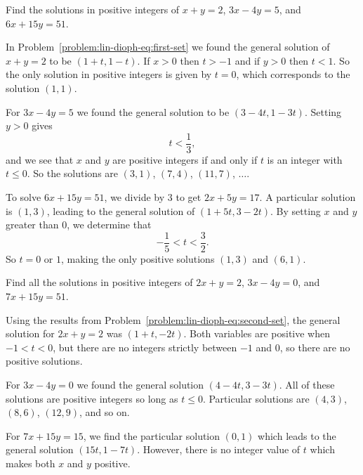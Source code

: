 Find the solutions in positive integers of $x + y = 2$,
$3x - 4y = 5$, and $6x + 15y = 51$.
\begin{solution}
  In Problem~\ref{problem:lin-dioph-eq:first-set} we found the general
  solution of $x + y = 2$ to be $(1+t,1-t)$. If $x > 0$ then $t > -1$
  and if $y > 0$ then $t < 1$. So the only solution in positive
  integers is given by $t = 0$, which corresponds to the solution
  $(1,1)$.

  For $3x - 4y = 5$ we found the general solution to be
  $(3 - 4t, 1 - 3t)$. Setting $y > 0$ gives
  \begin{equation*}
    t < \frac13,
  \end{equation*}
  and we see that $x$ and $y$ are positive integers if and only if $t$
  is an integer with $t\leq0$. So the solutions are $(3,1)$, $(7,4)$,
  $(11,7)$, $\dots$.

  To solve $6x + 15y = 51$, we divide by $3$ to get $2x + 5y = 17$. A
  particular solution is $(1,3)$, leading to the general solution of
  $(1+5t,3-2t)$. By setting $x$ and $y$ greater than $0$, we determine
  that
  \begin{equation*}
    -\frac15 < t < \frac32.
  \end{equation*}
  So $t = 0$ or $1$, making the only positive solutions $(1,3)$ and
  $(6,1)$.
\end{solution}

 Find all the solutions in positive integers of $2x + y = 2$,
$3x - 4y = 0$, and $7x + 15y = 51$.
\begin{solution}
  Using the results from
  Problem~\ref{problem:lin-dioph-eq:second-set}, the general solution
  for $2x + y = 2$ was $(1+t,-2t)$. Both variables are positive when
  $-1<t<0$, but there are no integers strictly between $-1$ and $0$,
  so there are no positive solutions.

  For $3x - 4y = 0$ we found the general solution $(4-4t,3-3t)$. All
  of these solutions are positive integers so long as
  $t\leq0$. Particular solutions are $(4,3)$, $(8,6)$, $(12,9)$, and
  so on.

  For $7x + 15y = 15$, we find the particular solution $(0,1)$ which
  leads to the general solution $(15t,1-7t)$. However, there is no
  integer value of $t$ which makes both $x$ and $y$ positive.
\end{solution}

